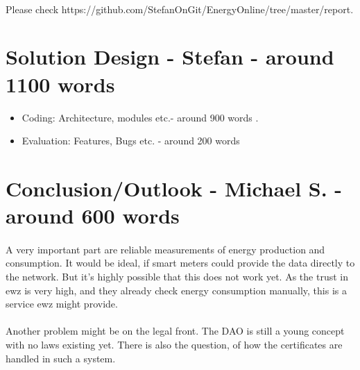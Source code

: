 \documentclass{scrartcl}
\begin{document}
    \paragraph{}
    Please check https://github.com/StefanOnGit/EnergyOnline/tree/master/report.

    
    \section{Solution Design - Stefan - around 1100 words}
   
    \begin{itemize}
    \item Coding: Architecture, modules etc.- around 900 words .
    \item Evaluation: Features, Bugs etc. - around 200 words
    \end{itemize}
	
    \section{Conclusion/Outlook - Michael S. - around 600 words}
	\paragraph{}
	A very important part are reliable measurements of energy production and consumption. It would be ideal, if smart meters could provide the data directly to the network. But it's highly possible that this does not work yet. As the trust in ewz is very high, and they already check energy consumption manually, this is a service ewz might provide.
	
    \paragraph{}
	Another problem might be on the legal front. The DAO is still a young concept with no laws existing yet. There is also the question, of how the certificates are handled in such a system.  
    
\end{document}
